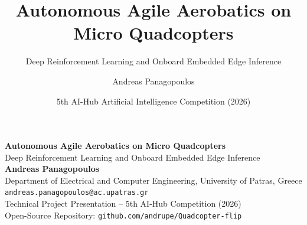 \documentclass[aspectratio=169,9pt]{beamer}
\title{Autonomous Agile Aerobatics on Micro Quadcopters}
\subtitle{Deep Reinforcement Learning and Onboard Embedded Edge Inference}
\author{Andreas Panagopoulos}
\institute{Department of Electrical and Computer Engineering\\ University of Patras, Greece}
\date{5th AI-Hub Artificial Intelligence Competition (2026)}
\begin{document}
\begin{frame}[plain]
  \vspace{2.0em}
  \begin{center}
    {\LARGE\bfseries Autonomous Agile Aerobatics on Micro Quadcopters}\\[0.4em]
    {\normalsize Deep Reinforcement Learning and Onboard Embedded Edge Inference}\\[1.6em]
    
    {\normalsize\bfseries Andreas Panagopoulos}\\[0.2em]
    {\footnotesize Department of Electrical and Computer Engineering, University of Patras, Greece}\\[0.15em]
    {\scriptsize\texttt{andreas.panagopoulos@ac.upatras.gr}}\\[1.6em]
    
    {\footnotesize Technical Project Presentation -- 5th AI-Hub Competition (2026)}\\[0.2em]
    {\scriptsize Open-Source Repository: \texttt{github.com/andrupe/Quadcopter-flip}}
  \end{center}
\end{frame}
\end{document}
